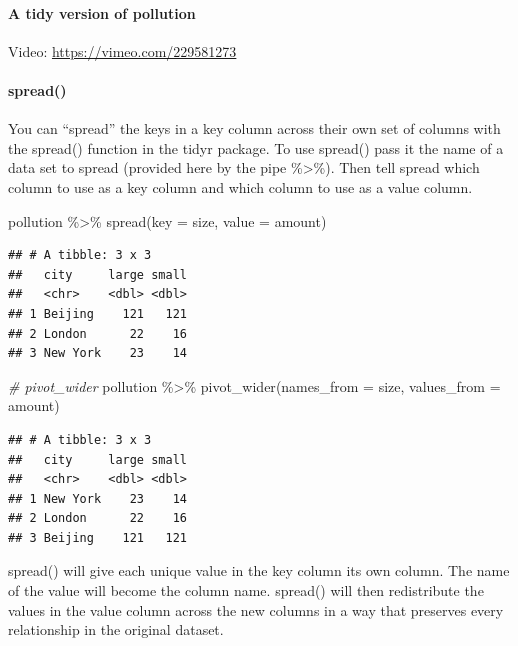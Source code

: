 \documentclass[
]{article}
\newenvironment{Shaded}{\begin{snugshade}}{\end{snugshade}}
\newcommand{\AttributeTok}[1]{\textcolor[rgb]{0.77,0.63,0.00}{#1}}
\newcommand{\CommentTok}[1]{\textcolor[rgb]{0.56,0.35,0.01}{\textit{#1}}}
\newcommand{\FunctionTok}[1]{\textcolor[rgb]{0.00,0.00,0.00}{#1}}
\newcommand{\NormalTok}[1]{#1}
\newcommand{\SpecialCharTok}[1]{\textcolor[rgb]{0.00,0.00,0.00}{#1}}
\begin{document}
\hypertarget{a-tidy-version-of-pollution}{%
\paragraph{A tidy version of
pollution}\label{a-tidy-version-of-pollution}}

Video: \url{https://vimeo.com/229581273}

\hypertarget{spread}{%
\paragraph{spread()}\label{spread}}

You can ``spread'' the keys in a key column across their own set of
columns with the spread() function in the tidyr package. To use spread()
pass it the name of a data set to spread (provided here by the pipe
\%\textgreater\%). Then tell spread which column to use as a key column
and which column to use as a value column.

\begin{Shaded}
\begin{Highlighting}[]
\NormalTok{pollution }\SpecialCharTok{\%\textgreater{}\%} \FunctionTok{spread}\NormalTok{(}\AttributeTok{key =}\NormalTok{ size, }\AttributeTok{value =}\NormalTok{ amount)}
\end{Highlighting}
\end{Shaded}

\begin{verbatim}
## # A tibble: 3 x 3
##   city     large small
##   <chr>    <dbl> <dbl>
## 1 Beijing    121   121
## 2 London      22    16
## 3 New York    23    14
\end{verbatim}

\begin{Shaded}
\begin{Highlighting}[]
\CommentTok{\# pivot\_wider}
\NormalTok{pollution }\SpecialCharTok{\%\textgreater{}\%} \FunctionTok{pivot\_wider}\NormalTok{(}\AttributeTok{names\_from =}\NormalTok{ size, }\AttributeTok{values\_from =}\NormalTok{ amount)}
\end{Highlighting}
\end{Shaded}

\begin{verbatim}
## # A tibble: 3 x 3
##   city     large small
##   <chr>    <dbl> <dbl>
## 1 New York    23    14
## 2 London      22    16
## 3 Beijing    121   121
\end{verbatim}

spread() will give each unique value in the key column its own column.
The name of the value will become the column name. spread() will then
redistribute the values in the value column across the new columns in a
way that preserves every relationship in the original dataset.
\end{document}
